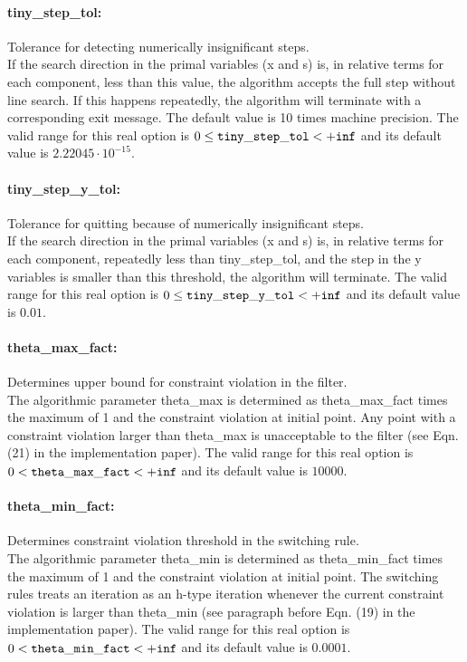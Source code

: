 \paragraph{tiny\_step\_tol:} Tolerance for detecting numerically insignificant steps. $\;$ \\
 If the search direction in the primal variables
(x and s) is, in relative terms for each
component, less than this value, the algorithm
accepts the full step without line search.  If
this happens repeatedly, the algorithm will
terminate with a corresponding exit message. The
default value is 10 times machine precision. The valid range for this real option is 
$0 \le {\tt tiny\_step\_tol } <  {\tt +inf}$
and its default value is $2.22045 \cdot 10^{-15}$.


\paragraph{tiny\_step\_y\_tol:} Tolerance for quitting because of numerically insignificant steps. $\;$ \\
 If the search direction in the primal variables
(x and s) is, in relative terms for each
component, repeatedly less than tiny\_step\_tol,
and the step in the y variables is smaller than
this threshold, the algorithm will terminate. The valid range for this real option is 
$0 \le {\tt tiny\_step\_y\_tol } <  {\tt +inf}$
and its default value is $0.01$.


\paragraph{theta\_max\_fact:} Determines upper bound for constraint violation in the filter. $\;$ \\
 The algorithmic parameter theta\_max is
determined as theta\_max\_fact times the maximum
of 1 and the constraint violation at initial
point.  Any point with a constraint violation
larger than theta\_max is unacceptable to the
filter (see Eqn. (21) in the implementation paper). The valid range for this real option is 
$0 <  {\tt theta\_max\_fact } <  {\tt +inf}$
and its default value is $10000$.


\paragraph{theta\_min\_fact:} Determines constraint violation threshold in the switching rule. $\;$ \\
 The algorithmic parameter theta\_min is
determined as theta\_min\_fact times the maximum
of 1 and the constraint violation at initial
point.  The switching rules treats an iteration
as an h-type iteration whenever the current
constraint violation is larger than theta\_min
(see paragraph before Eqn. (19) in the implementation
paper). The valid range for this real option is 
$0 <  {\tt theta\_min\_fact } <  {\tt +inf}$
and its default value is $0.0001$.


